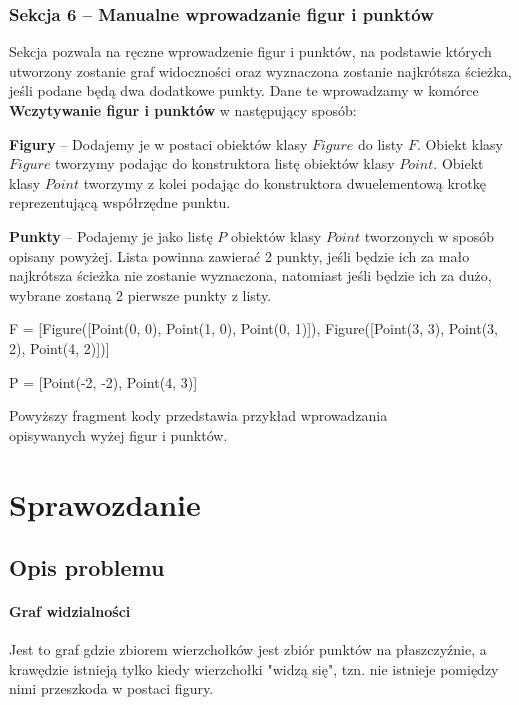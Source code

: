 \documentclass[12pt]{article}
\let\tempone\itemize
\let\temptwo\enditemize
\renewenvironment{itemize}{\tempone\setlength{\itemsep}{0cm}}{\temptwo}
\begin{document}
			\subsubsection{Sekcja 6 -- Manualne wprowadzanie figur i punktów}
				Sekcja pozwala na ręczne wprowadzenie figur i punktów, na podstawie których utworzony zostanie graf widoczności oraz wyznaczona zostanie najkrótsza ścieżka, jeśli podane będą dwa dodatkowe punkty. Dane te wprowadzamy w komórce \textbf{Wczytywanie figur i punktów} w następujący sposób:
				\begin{itemize}
					\item \textbf{Figury} -- Dodajemy je w postaci obiektów klasy $ Figure $ do listy $ F $. Obiekt klasy $ Figure $ tworzymy podając do konstruktora listę obiektów klasy $ Point $. Obiekt klasy $ Point $ tworzymy z kolei podając do konstruktora dwuelementową krotkę reprezentującą współrzędne punktu.
					\item \textbf{Punkty} -- Podajemy je jako listę $ P $ obiektów klasy $ Point $ tworzonych w sposób opisany powyżej. Lista powinna zawierać 2 punkty, jeśli będzie ich za mało najkrótsza ścieżka nie zostanie wyznaczona, natomiast jeśli będzie ich za dużo, wybrane zostaną 2 pierwsze punkty z listy.
				\end{itemize}
				
				\vspace{\baselineskip} %
				
				\begin{python}
					
F = [Figure([Point(0, 0), Point(1, 0), Point(0, 1)]), 
	 Figure([Point(3, 3), Point(3, 2), Point(4, 2)])]

P = [Point(-2, -2), Point(4, 3)] 
				\end{python}
				
				\begin{center}
					Powyższy fragment kody przedstawia przykład wprowadzania\\ opisywanych wyżej figur i punktów.
				\end{center}
			
		
	\section{Sprawozdanie}
	
	\subsection{Opis problemu}
		\paragraph{Graf widzialności}
			Jest to graf gdzie zbiorem wierzchołków jest zbiór punktów na płaszczyźnie, a krawędzie istnieją tylko kiedy wierzchołki "widzą się", tzn. nie istnieje pomiędzy nimi przeszkoda w postaci figury.
		
\end{document}
